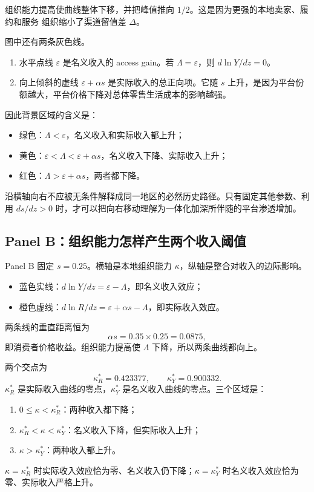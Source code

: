 \documentclass[UTF8,11pt,scheme=chinese,fontset=fandol]{ctexart}
\theoremstyle{definition}
\begin{document}
组织能力提高使曲线整体下移，并把峰值推向 \(1/2\)。这是因为更强的本地卖家、履约和服务
组织缩小了渠道留值差 \(\Delta\)。

图中还有两条灰色线。

\begin{enumerate}
  \item 水平点线 \(\varepsilon\) 是名义收入的 access gain。若
  \(\Lambda=\varepsilon\)，则 \(d\ln Y/dz=0\)。
  \item 向上倾斜的虚线 \(\varepsilon+\alpha s\) 是实际收入的总正向项。它随 \(s\)
  上升，是因为平台份额越大，平台价格下降对总体零售生活成本的影响越强。
\end{enumerate}

因此背景区域的含义是：
\begin{itemize}
  \item 绿色：\(\Lambda<\varepsilon\)，名义收入和实际收入都上升；
  \item 黄色：\(\varepsilon<\Lambda<\varepsilon+\alpha s\)，名义收入下降、实际收入上升；
  \item 红色：\(\Lambda>\varepsilon+\alpha s\)，两者都下降。
\end{itemize}

沿横轴向右不应被无条件解释成同一地区的必然历史路径。只有固定其他参数、利用
\(ds/dz>0\) 时，才可以把向右移动理解为一体化加深所伴随的平台渗透增加。

\subsection{Panel B：组织能力怎样产生两个收入阈值}

Panel B 固定 \(s=0.25\)。横轴是本地组织能力 \(\kappa\)，纵轴是整合对收入的边际影响。

\begin{itemize}
  \item 蓝色实线：\(d\ln Y/dz=\varepsilon-\Lambda\)，即名义收入效应；
  \item 橙色虚线：\(d\ln R/dz=\varepsilon+\alpha s-\Lambda\)，即实际收入效应。
\end{itemize}

两条线的垂直距离恒为
\[
\alpha s=0.35\times0.25=0.0875,
\]
即消费者价格收益。组织能力提高使 \(\Lambda\) 下降，所以两条曲线都向上。

两个交点为
\[
\kappa_R^*=0.423377,
\qquad
\kappa_Y^*=0.900332.
\]
\(\kappa_R^*\) 是实际收入曲线的零点，\(\kappa_Y^*\) 是名义收入曲线的零点。三个区域是：

\begin{enumerate}
  \item \(0\le\kappa<\kappa_R^*\)：两种收入都下降；
  \item \(\kappa_R^*<\kappa<\kappa_Y^*\)：名义收入下降，但实际收入上升；
  \item \(\kappa>\kappa_Y^*\)：两种收入都上升。
\end{enumerate}
\(\kappa=\kappa_R^*\) 时实际收入效应恰为零、名义收入仍下降；\(\kappa=\kappa_Y^*\)
时名义收入效应恰为零、实际收入严格上升。
\end{document}
